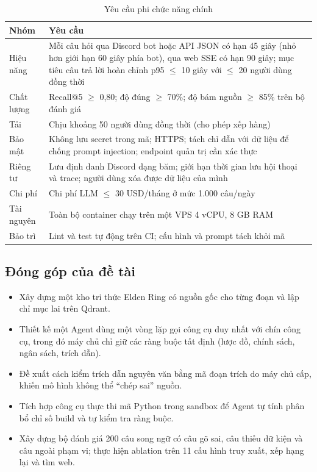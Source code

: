 \begin{table}[H]
    \centering
    \caption{Yêu cầu phi chức năng chính}
    \label{tab:nfr}
    \small
    \begin{tabularx}{\textwidth}{|>{\raggedright\arraybackslash}p{2.8cm}|>{\raggedright\arraybackslash}X|}
        \toprule
        \textbf{Nhóm} & \textbf{Yêu cầu} \\
        \midrule
        Hiệu năng & Mỗi câu hỏi qua Discord bot hoặc API JSON có hạn 45 giây (nhỏ hơn giới hạn 60 giây phía bot), qua web SSE có hạn 90 giây; mục tiêu câu trả lời hoàn chỉnh p95 $\leq$ 10 giây với $\leq$ 20 người dùng đồng thời \\ \hline
        Chất lượng & Recall@5 $\geq$ 0,80; độ đúng $\geq$ 70\%; độ bám nguồn $\geq$ 85\% trên bộ đánh giá \\ \hline
        Tải & Chịu khoảng 50 người dùng đồng thời (cho phép xếp hàng) \\ \hline
        Bảo mật & Không lưu secret trong mã; HTTPS; tách chỉ dẫn với dữ liệu để chống prompt injection; endpoint quản trị cần xác thực \\ \hline
        Riêng tư & Lưu định danh Discord dạng băm; giới hạn thời gian lưu hội thoại và trace; người dùng xóa được dữ liệu của mình \\ \hline
        Chi phí & Chi phí LLM $\leq$ 30 USD/tháng ở mức 1.000 câu/ngày \\ \hline
        Tài nguyên & Toàn bộ container chạy trên một VPS 4 vCPU, 8 GB RAM \\ \hline
        Bảo trì & Lint và test tự động trên CI; cấu hình và prompt tách khỏi mã \\
        \bottomrule
    \end{tabularx}
\end{table}

\subsection{Đóng góp của đề tài}
\label{sec:contributions}

\begin{itemize}
    \item Xây dựng một kho tri thức Elden Ring có nguồn gốc cho từng đoạn và lập chỉ mục lai trên Qdrant.
    \item Thiết kế một Agent dùng một vòng lặp gọi công cụ duy nhất với chín công cụ, trong đó máy chủ chỉ giữ các ràng buộc tất định (lược đồ, chính sách, ngân sách, trích dẫn).
    \item Đề xuất cách kiểm trích dẫn nguyên văn bằng mã đoạn trích do máy chủ cấp, khiến mô hình không thể ``chép sai'' nguồn.
    \item Tích hợp công cụ thực thi mã Python trong sandbox để Agent tự tính phân bổ chỉ số build và tự kiểm tra ràng buộc.
    \item Xây dựng bộ đánh giá 200 câu song ngữ có câu gõ sai, câu thiếu dữ kiện và câu ngoài phạm vi; thực hiện ablation trên 11 cấu hình truy xuất, xếp hạng lại và tìm web.
\end{itemize}

